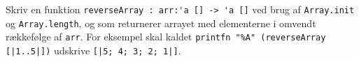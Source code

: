 Skriv en funktion \mbox{\lstinline{reverseArray : arr:'a [] -> 'a []}} ved brug af \lstinline{Array.init} og \lstinline{Array.length}, og som returnerer arrayet med elementerne i omvendt rækkefølge af \lstinline{arr}.  For eksempel skal kaldet \lstinline{printfn "%A" (reverseArray [|1..5|])} %
    udskrive \mbox{\lstinline{[|5; 4; 3; 2; 1|]}}.
